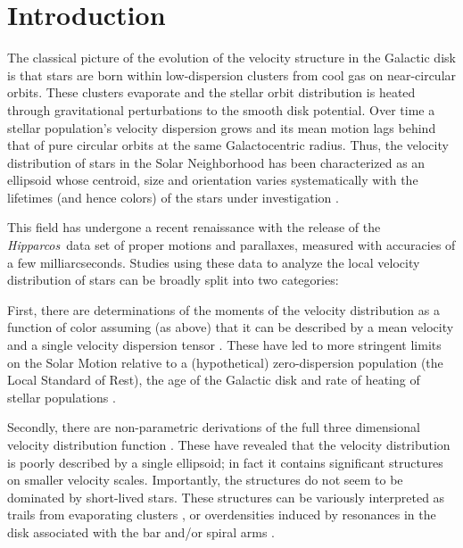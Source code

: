 \documentclass[12pt,preprint]{aastex}
\newcommand{\latin}[1]{\textit{#1}}
\newcommand{\eg}{\latin{e.g.}}
\newcommand{\Hipparcos}{\textit{Hipparcos}}
\begin{document}

\section{Introduction}

The classical picture of the evolution of the velocity structure in
the Galactic disk is that stars are born within low-dispersion
clusters from cool gas on near-circular orbits.  These clusters
evaporate and the stellar orbit distribution is heated through
gravitational perturbations to the smooth disk potential.  Over time a
stellar population's velocity dispersion grows and its mean motion
lags behind that of pure circular orbits at the same Galactocentric
radius.  Thus, the velocity distribution of stars in the Solar
Neighborhood has been characterized as an ellipsoid whose centroid,
size and orientation varies systematically with the lifetimes (and
hence colors) of the stars under investigation
\citep[\eg, ][]{dehnen98a}.

This field has undergone a recent renaissance with the release of the
\Hipparcos\ data set of proper motions and parallaxes, measured with
accuracies of a few milliarcseconds.  Studies using these data to
analyze the local velocity distribution of stars can be broadly split
into two categories:

First, there are determinations of the moments of the velocity
distribution as a function of color assuming (as above) that it can be
described by a mean velocity and a single velocity dispersion tensor
\citep{dehnen98a, bienayme99a}.  These have led to more stringent
limits on the Solar Motion relative to a (hypothetical)
zero-dispersion population (the Local Standard of Rest), the age of
the Galactic disk and rate of heating of stellar populations
\citep{binney00a}.

Secondly, there are non-parametric derivations of the full three
dimensional velocity distribution function \citep{dehnen98b,
skuljan99a, chereul98a}.  These have revealed that the velocity
distribution is poorly described by a single ellipsoid; in fact it
contains significant structures on smaller velocity scales.
Importantly, the structures do not seem to be dominated by short-lived
stars.  These structures can be variously interpreted as trails from
evaporating clusters \citep{chereul99a}, or overdensities induced by
resonances in the disk associated with the bar \citep{dehnen00a,
fux01a} and/or spiral arms \citep{quillen03a}.
\end{document}
